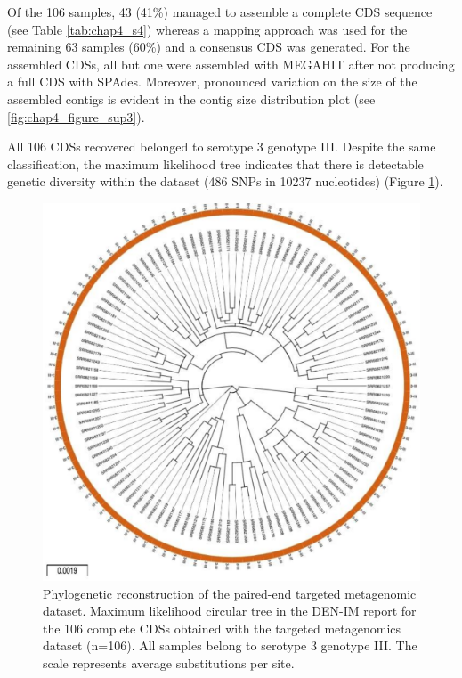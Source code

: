 Of the 106 samples, 43 (41\%) managed to assemble a complete CDS sequence (see Table \ref{tab:chap4_s4}) whereas a mapping approach was used for the remaining 63 samples (60\%) and a consensus CDS was generated. For the assembled CDSs, all but one were assembled with MEGAHIT after not producing a full CDS with SPAdes. Moreover, pronounced variation on the size of the assembled contigs is evident in the contig size distribution plot (see \ref{fig:chap4_figure_sup3}).

All 106 CDSs recovered belonged to serotype 3 genotype III. Despite the same classification, the maximum likelihood tree indicates that there is detectable genetic diversity within the dataset (486 SNPs in 10237 nucleotides) (Figure \ref{fig:chap4_figure3}).

\begin{figure}[h!]
\centering
\includegraphics[width=\textwidth]{figures/chapter 4/Figure3_phylo_tree_amplicon.pdf}
\caption{Phylogenetic reconstruction of the paired-end targeted metagenomic dataset. Maximum likelihood circular tree in the DEN-IM report for the 106 complete CDSs obtained with the targeted metagenomics dataset (n=106). All samples belong to serotype 3 genotype III. The scale represents average substitutions per site.}
\label{fig:chap4_figure3}
\end{figure}

